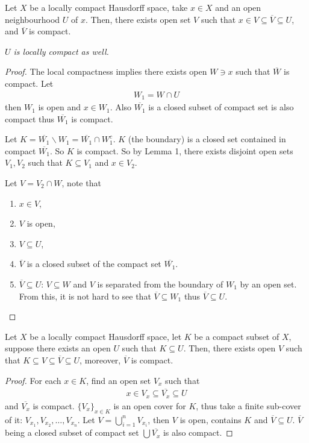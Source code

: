 \documentclass[11pt]{article}
\begin{document}
	\begin{lemma}
		Let $X$ be a locally compact Hausdorff space, take $x \in X$ and an open neighbourhood $U$ of $x$. Then, there exists open set $V$ such that $x \in V \subseteq \overline{V} \subseteq U$, and $\overline{V}$ is compact.
		
		\emph{$U$ is locally compact as well.}
		\begin{proof}
			The local compactness implies there exists open $W \ni x$ such that $\overline{W}$ is compact. Let
			\begin{align}
				W_1 = W \cap U
			\end{align}
			then
			$W_1$ is open and $x \in W_1$. Also $\overline{W_1}$ is a closed subset of compact set is also compact thus $\overline{W_1}$ is compact.
			
			Let $K = \overline{W_1} \backslash W_1 = \overline{W_1} \cap W_1^c$. $K$ (the boundary) is a closed set contained in compact $\overline{W_1}$. So $K$ is compact.
			So by Lemma 1, there exists disjoint open sets $V_1, V_2$ such that $K \subseteq V_1$ and $x \in V_2$.
			
			Let $V = V_2 \cap W$, note that
			\begin{enumerate}
				\item $x \in V$,
				\item $V$ is open,
				\item $V \subseteq U$,
				\item $\overline{V}$ is a closed subset of the compact set $\overline{W_1}$.
				\item $\overline{V} \subseteq U$: $V \subseteq W$ and $V$ is separated from the boundary of $W_1$ by an open set. From this, it is not hard to see that $\overline{V} \subseteq W_1$ thus $\overline{V} \subseteq U$.
			\end{enumerate}
		\end{proof}
	\end{lemma}
	
	\begin{lemma}
		Let $X$ be a locally compact Hausdorff space, let $K$ be a compact subset of $X$, suppose there exists an open $U$ such that $K \subseteq U$.
		Then, there exists open $V$ such that $K \subseteq V \subseteq \overline{V} \subseteq U$, moreover, $\overline{V}$ is compact.
		\begin{proof}
			For each $x \in K$, find an open set $V_x$ such that
			\begin{align}
				x \in V_x \subseteq \overline{V_x} \subseteq U
			\end{align}
			and $\overline{V_x}$ is compact. $\{V_x\}_{x \in K}$ is an open cover for $K$, thus take a finite sub-cover of it: $V_{x_1}, V_{x_2}, \dots, V_{x_n}$. Let $V = \bigcup_{i=1}^n V_{x_i}$, then $V$ is open, contains $K$ and $\overline{V} \subseteq U$.
			$\overline{V}$ being a closed subset of compact set $\bigcup \overline{V_x}$ is also compact.
		\end{proof}
	\end{lemma}
	
\end{document}
